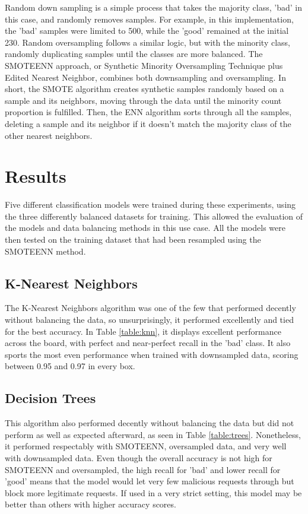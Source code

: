\documentclass[conference]{IEEEtran}
\begin{document}
    Random down sampling is a simple process that takes the majority class, 'bad' in this case, and randomly removes samples. For example, in this implementation, the 'bad' samples were limited to 500, while the 'good' remained at the initial 230. Random oversampling follows a similar logic, but with the minority class, randomly duplicating samples until the classes are more balanced. The SMOTEENN approach, or Synthetic Minority Oversampling Technique plus Edited Nearest Neighbor, combines both downsampling and oversampling. In short, the SMOTE algorithm creates synthetic samples randomly based on a sample and its neighbors, moving through the data until the minority count proportion is fulfilled. Then, the ENN algorithm sorts through all the samples, deleting a sample and its neighbor if it doesn't match the majority class of the other nearest neighbors.

\section{Results}
    Five different classification models were trained during these experiments, using the three differently balanced datasets for training. This allowed the evaluation of the models and data balancing methods in this use case. All the models were then tested on the training dataset that had been resampled using the SMOTEENN method.
    
    \subsection{K-Nearest Neighbors}
    The K-Nearest Neighbors algorithm was one of the few that performed decently without balancing the data, so unsurprisingly, it performed excellently and tied for the best accuracy. In Table \ref{table:knn}, it displays excellent performance across the board, with perfect and near-perfect recall in the 'bad' class. It also sports the most even performance when trained with downsampled data, scoring between 0.95 and 0.97 in every box.
    
    \subsection{Decision Trees}
    This algorithm also performed decently without balancing the data but did not perform as well as expected afterward, as seen in Table \ref{table:trees}. Nonetheless, it performed respectably with SMOTEENN, oversampled data, and very well with downsampled data. Even though the overall accuracy is not high for SMOTEENN and oversampled, the high recall for 'bad' and lower recall for 'good' means that the model would let very few malicious requests through but block more legitimate requests. If used in a very strict setting, this model may be better than others with higher accuracy scores.
\end{document}
